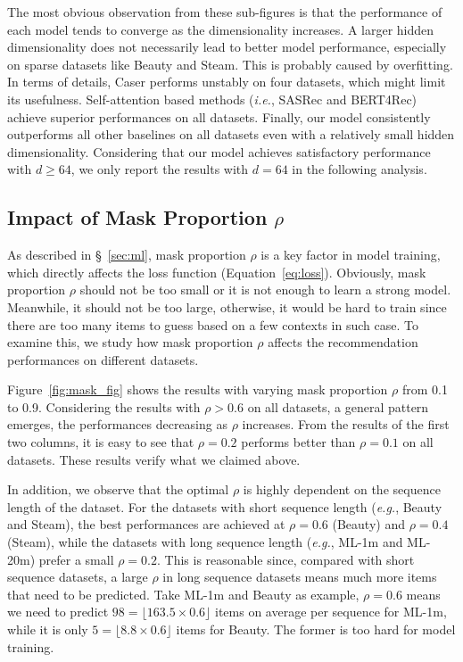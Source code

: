 The most obvious observation from these sub-figures is that the performance of each model tends to converge as the dimensionality increases.
A larger hidden dimensionality does not necessarily lead to better model performance, especially on sparse datasets like Beauty and Steam.
This is probably caused by overfitting.
In terms of details, Caser performs unstably on four datasets, which might limit its usefulness.
Self-attention based methods (\textit{i.e.}, SASRec and BERT4Rec) achieve superior performances on all datasets. %
Finally, our model consistently outperforms all other baselines on all datasets even with a relatively small hidden dimensionality.
Considering that our model achieves satisfactory performance with $d {\geq} 64$, we only report the results with $d{=}64$ in the following analysis.

\subsection{Impact of Mask Proportion $\rho$}
\label{sec:mask}



As described in \S~\ref{sec:ml}, mask proportion $\rho$ is a key factor in model training, which directly affects the loss function (Equation~\ref{eq:loss}).
Obviously, mask proportion $\rho$ should not be too small or it is not enough to learn a strong model.
Meanwhile, it should not be too large, otherwise, it would be hard to train since there are too many items to guess based on a few contexts in such case.
To examine this, we study how mask proportion $\rho$ affects the recommendation performances on different datasets.

Figure~\ref{fig:mask_fig} shows the results with varying mask proportion $\rho$ from 0.1 to 0.9.
Considering the results with $\rho > 0.6$ on all datasets, a general pattern emerges, the performances decreasing as $\rho$ increases.
From the results of the first two columns, it is easy to see that $\rho=0.2$ performs better than $\rho=0.1$ on all datasets.
These results verify what we claimed above.


In addition, we observe that the optimal $\rho$ is highly dependent on the sequence length of the dataset.
For the datasets with short sequence length (\textit{e.g.}, Beauty and Steam), the best performances are achieved at $\rho{=}0.6$ (Beauty) and $\rho{=}0.4$ (Steam), while the datasets with long sequence length (\textit{e.g.}, ML-1m and ML-20m) prefer a small $\rho{=}0.2$.
This is reasonable since, compared with short sequence datasets, a large $\rho$ in long sequence datasets means much more items that need to be predicted. %
Take ML-1m and Beauty as example, $\rho{=}0.6$ means we need to predict $98 {=} \lfloor 163.5{\times} 0.6 \rfloor $ items on average per sequence for ML-1m, while it is only $5 {=} \lfloor 8.8{\times} 0.6 \rfloor$ items for Beauty.
The former is too hard for model training.







